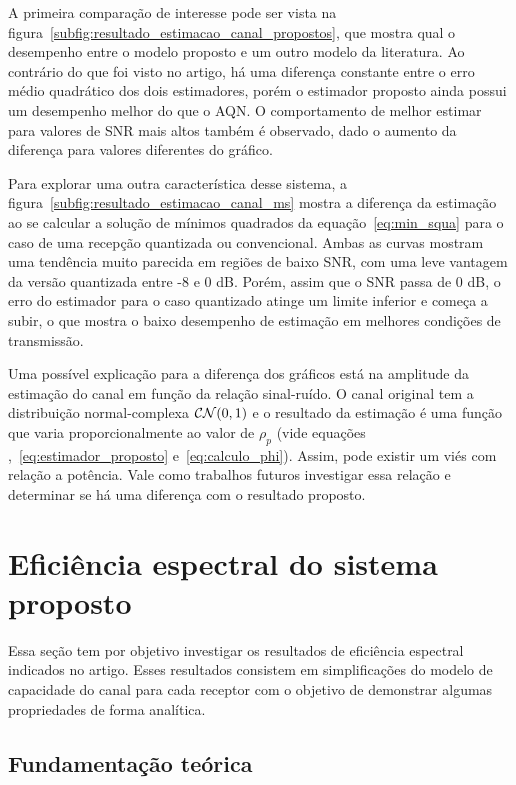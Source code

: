 \documentclass{article}
\begin{document}
A primeira comparação de interesse pode ser vista na figura~\ref{subfig:resultado_estimacao_canal_propostos}, que mostra qual o desempenho entre o modelo proposto e um outro modelo da literatura. Ao contrário do que foi visto no artigo, há uma diferença constante entre o erro médio quadrático dos dois estimadores, porém o estimador proposto ainda possui um desempenho melhor do que o AQN. O comportamento de melhor estimar para valores de SNR mais altos também é observado, dado o aumento da diferença para valores diferentes do gráfico. 

Para explorar uma outra característica desse sistema, a figura~\ref{subfig:resultado_estimacao_canal_ms} mostra a diferença da estimação ao se calcular a solução de mínimos quadrados da equação~\eqref{eq:min_squa} para o caso de uma recepção quantizada ou convencional. Ambas as curvas mostram uma tendência muito parecida em regiões de baixo SNR, com uma leve vantagem da versão quantizada entre -8 e 0 dB. Porém, assim que o SNR passa de 0 dB, o erro do estimador para o caso quantizado atinge um limite inferior e começa a subir, o que mostra o baixo desempenho de estimação em melhores condições de transmissão. 

Uma possível explicação para a diferença dos gráficos está na amplitude da estimação do canal em função da relação sinal-ruído. O canal original tem a distribuição normal-complexa $\mathcal{C}\mathcal{N}(0,1)$  e o resultado da estimação é uma função que varia proporcionalmente ao valor de $\rho_p$ (vide equações~\cite[eq. 11]{li.etal_2017a} ,~\eqref{eq:estimador_proposto} e~\eqref{eq:calculo_phi}). Assim, pode existir um viés com relação a potência. Vale como trabalhos futuros investigar essa relação e determinar se há uma diferença com o resultado proposto.

\section{Eficiência espectral do sistema proposto}
\label{sec:capacidade_canal}

Essa seção tem por objetivo investigar os resultados de eficiência espectral indicados no artigo. Esses resultados consistem em simplificações do modelo de capacidade do canal para cada receptor com o objetivo de demonstrar algumas propriedades de forma analítica. 

\subsection{Fundamentação teórica}
\end{document}
